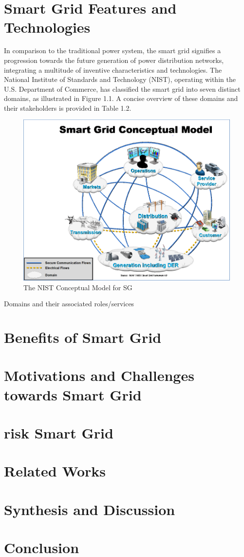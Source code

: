\section{Smart Grid Features and Technologies } 
In comparison to the traditional power system, the smart grid signifies a progression towards the future generation of power distribution networks, integrating a multitude of inventive characteristics and technologies. The National Institute of Standards and Technology (NIST), operating within the U.S. Department of Commerce, has classified the smart grid into seven distinct domains, as illustrated in Figure 1.1. A concise overview of these domains and their stakeholders is provided in Table 1.2.\cite{gopstein2021nist}
\begin{figure}[h]
	\centering
	\includegraphics[width=\textwidth]{figures/nist.PNG}
	\caption{The NIST Conceptual Model for SG \cite{gopstein2021nist}}
	\label{fig:example}
\end{figure}
\begin{table}[h]
    \centering
    
    \caption{Domains and their associated roles/services \cite{gopstein2021nist}}
    \label{table:domains}
\end{table}
\section{Benefits of Smart Grid}  
\section{Motivations and Challenges towards Smart Grid }  
\section{risk Smart Grid }  

\section{Related Works}
\section{Synthesis and Discussion}
\section*{Conclusion}
